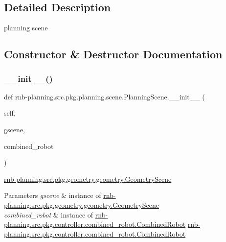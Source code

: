 \subsection{Detailed Description}
planning scene 

\subsection{Constructor \& Destructor Documentation}
\mbox{\label{classrnb-planning_1_1src_1_1pkg_1_1planning_1_1scene_1_1_planning_scene_a10c03811b4653bdb2b9bd259f8b598c1}} 
\subsubsection{\texorpdfstring{\+\_\+\+\_\+init\+\_\+\+\_\+()}{\_\_init\_\_()}}
{\footnotesize\ttfamily def rnb-\/planning.\+src.\+pkg.\+planning.\+scene.\+Planning\+Scene.\+\_\+\+\_\+init\+\_\+\+\_\+ (\begin{DoxyParamCaption}\item[{}]{self,  }\item[{}]{gscene,  }\item[{}]{combined\+\_\+robot }\end{DoxyParamCaption})}



\hyperlink{classrnb-planning_1_1src_1_1pkg_1_1geometry_1_1geometry_1_1_geometry_scene}{rnb-\/planning.\+src.\+pkg.\+geometry.\+geometry.\+Geometry\+Scene} 


\begin{DoxyParams}{Parameters}
{\em gscene} & instance of \hyperlink{classrnb-planning_1_1src_1_1pkg_1_1geometry_1_1geometry_1_1_geometry_scene}{rnb-\/planning.\+src.\+pkg.\+geometry.\+geometry.\+Geometry\+Scene} \\
\hline
{\em combined\+\_\+robot} & instance of \hyperlink{classrnb-planning_1_1src_1_1pkg_1_1controller_1_1combined__robot_1_1_combined_robot}{rnb-\/planning.\+src.\+pkg.\+controller.\+combined\+\_\+robot.\+Combined\+Robot} \hyperlink{classrnb-planning_1_1src_1_1pkg_1_1controller_1_1combined__robot_1_1_combined_robot}{rnb-\/planning.\+src.\+pkg.\+controller.\+combined\+\_\+robot.\+Combined\+Robot} \\
\hline
\end{DoxyParams}


